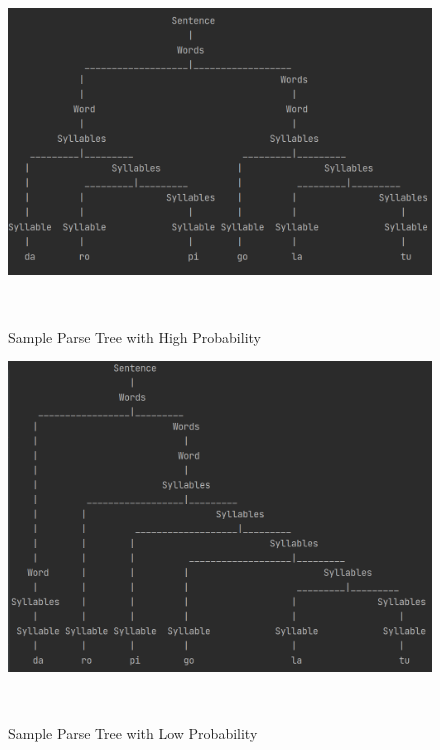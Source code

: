 \documentclass{article}
\begin{document}
\begin{figure}[h!]
  \centering
  \includegraphics[width=\columnwidth]{figures/sample_tree.png}
  \caption{Sample Parse Tree with High Probability}~\label{fig:figure1}
\end{figure}

\begin{figure}[h!]
  \centering
  \includegraphics[width=\columnwidth]{figures/sample_bad_tree.png}
  \caption{Sample Parse Tree with Low Probability}~\label{fig:figure2}
\end{figure}

\end{document}
